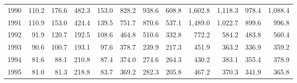 \begin{longtable}{rrrrrrrrrrrr}
1990 & 110.2 & 176.6 & 482.3 & 153.0 & 828.2 & 938.6 & 608.8 & 1,602.8 & 1,118.3 & 978.4 & 1,088.4 \\
1991 & 110.9 & 153.0 & 424.4 & 139.5 & 751.7 & 870.6 & 537.1 & 1,489.0 & 1,022.7 & 899.6 & 996.8 \\
1992 & 91.9 & 120.7 & 192.5 & 108.6 & 464.8 & 510.6 & 332.8 & 772.2 & 584.2 & 483.8 & 560.4 \\
1993 & 90.6 & 100.7 & 193.1 & 97.6 & 378.7 & 239.9 & 217.3 & 451.9 & 363.2 & 336.9 & 359.2 \\
1994 & 81.6 & 88.1 & 210.8 & 87.4 & 374.0 & 274.6 & 264.3 & 430.2 & 383.1 & 355.4 & 378.9 \\
1995 & 81.0 & 81.3 & 218.8 & 83.7 & 369.2 & 282.3 & 205.8 & 467.2 & 370.3 & 341.9 & 365.8 \\
\end{longtable}
\endgroup
